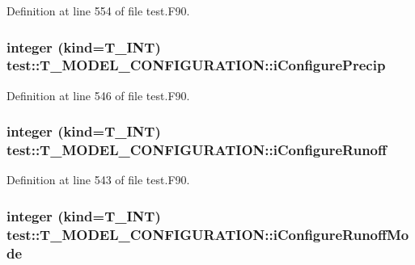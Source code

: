 Definition at line 554 of file test.F90.

\hypertarget{typetest_1_1_t___m_o_d_e_l___c_o_n_f_i_g_u_r_a_t_i_o_n_a311b249c880ae79d9d919c4c8d6cc2c4}{
\subsubsection[{iConfigurePrecip}]{\setlength{\rightskip}{0pt plus 5cm}integer (kind={\bf T\_\-INT}) {\bf test::T\_\-MODEL\_\-CONFIGURATION::iConfigurePrecip}}}
\label{typetest_1_1_t___m_o_d_e_l___c_o_n_f_i_g_u_r_a_t_i_o_n_a311b249c880ae79d9d919c4c8d6cc2c4}


Definition at line 546 of file test.F90.

\hypertarget{typetest_1_1_t___m_o_d_e_l___c_o_n_f_i_g_u_r_a_t_i_o_n_a28c276674b3f423d51e2302ca0584bcf}{
\subsubsection[{iConfigureRunoff}]{\setlength{\rightskip}{0pt plus 5cm}integer (kind={\bf T\_\-INT}) {\bf test::T\_\-MODEL\_\-CONFIGURATION::iConfigureRunoff}}}
\label{typetest_1_1_t___m_o_d_e_l___c_o_n_f_i_g_u_r_a_t_i_o_n_a28c276674b3f423d51e2302ca0584bcf}


Definition at line 543 of file test.F90.

\hypertarget{typetest_1_1_t___m_o_d_e_l___c_o_n_f_i_g_u_r_a_t_i_o_n_a25f9220d83a270f10efc168407454469}{
\subsubsection[{iConfigureRunoffMode}]{\setlength{\rightskip}{0pt plus 5cm}integer (kind={\bf T\_\-INT}) {\bf test::T\_\-MODEL\_\-CONFIGURATION::iConfigureRunoffMode}}}
\label{typetest_1_1_t___m_o_d_e_l___c_o_n_f_i_g_u_r_a_t_i_o_n_a25f9220d83a270f10efc168407454469}


